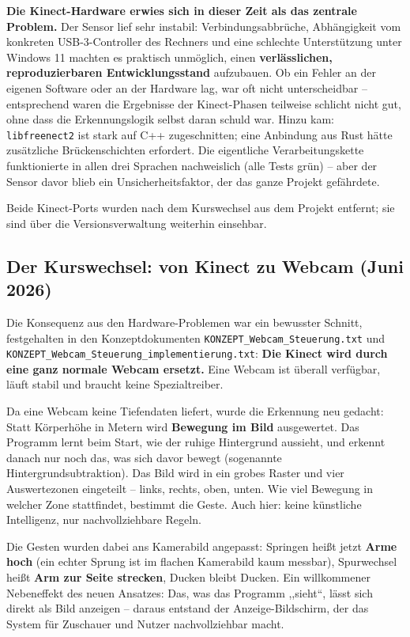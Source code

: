 \documentclass[12pt,a4paper]{article}
\newcommand{\code}[1]{\texttt{#1}}
\begin{document}
\textbf{Die Kinect-Hardware erwies sich in dieser Zeit als das zentrale Problem.} Der Sensor lief sehr instabil: Verbindungsabbrüche, Abhängigkeit vom konkreten USB-3-Controller des Rechners und eine schlechte Unterstützung unter Windows 11 machten es praktisch unmöglich, einen \textbf{verlässlichen, reproduzierbaren Entwicklungsstand} aufzubauen. Ob ein Fehler an der eigenen Software oder an der Hardware lag, war oft nicht unterscheidbar -- entsprechend waren die Ergebnisse der Kinect-Phasen teilweise schlicht nicht gut, ohne dass die Erkennungslogik selbst daran schuld war. Hinzu kam: \code{libfreenect2} ist stark auf C++ zugeschnitten; eine Anbindung aus Rust hätte zusätzliche Brückenschichten erfordert. Die eigentliche Verarbeitungskette funktionierte in allen drei Sprachen nachweislich (alle Tests grün) -- aber der Sensor davor blieb ein Unsicherheitsfaktor, der das ganze Projekt gefährdete.

Beide Kinect-Ports wurden nach dem Kurswechsel aus dem Projekt entfernt; sie sind über die Versionsverwaltung weiterhin einsehbar.

\subsection{Der Kurswechsel: von Kinect zu Webcam (Juni 2026)}

Die Konsequenz aus den Hardware-Problemen war ein bewusster Schnitt, festgehalten in den Konzeptdokumenten \code{KONZEPT\_Webcam\_Steuerung.txt} und \code{KONZEPT\_Webcam\_Steuerung\_implementierung.txt}: \textbf{Die Kinect wird durch eine ganz normale Webcam ersetzt.} Eine Webcam ist überall verfügbar, läuft stabil und braucht keine Spezialtreiber.

Da eine Webcam keine Tiefendaten liefert, wurde die Erkennung neu gedacht: Statt Körperhöhe in Metern wird \textbf{Bewegung im Bild} ausgewertet. Das Programm lernt beim Start, wie der ruhige Hintergrund aussieht, und erkennt danach nur noch das, was sich davor bewegt (sogenannte Hintergrundsubtraktion). Das Bild wird in ein grobes Raster und vier Auswertezonen eingeteilt -- links, rechts, oben, unten. Wie viel Bewegung in welcher Zone stattfindet, bestimmt die Geste. Auch hier: keine künstliche Intelligenz, nur nachvollziehbare Regeln.

Die Gesten wurden dabei ans Kamerabild angepasst: Springen heißt jetzt \textbf{Arme hoch} (ein echter Sprung ist im flachen Kamerabild kaum messbar), Spurwechsel heißt \textbf{Arm zur Seite strecken}, Ducken bleibt Ducken. Ein willkommener Nebeneffekt des neuen Ansatzes: Das, was das Programm ,,sieht``, lässt sich direkt als Bild anzeigen -- daraus entstand der Anzeige-Bildschirm, der das System für Zuschauer und Nutzer nachvollziehbar macht.
\end{document}

